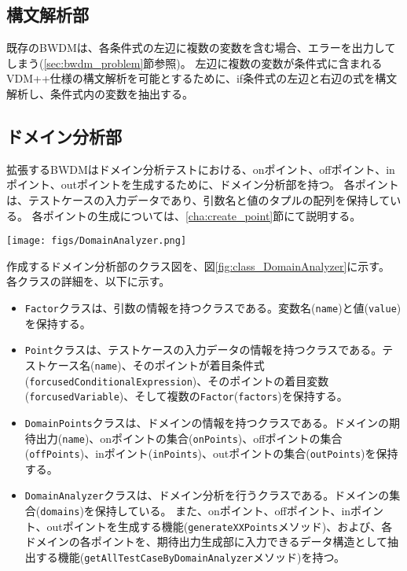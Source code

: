 \documentclass[uplatex, report, a4j, 10pt]{jsbook}
\newcommand\ttt[1]{\texttt{#1}}
\begin{document}
\subsection{構文解析部}
既存のBWDMは、各条件式の左辺に複数の変数を含む場合、エラーを出力してしまう(\ref{sec:bwdm_problem}節参照)。
左辺に複数の変数が条件式に含まれるVDM++仕様の構文解析を可能とするために、if条件式の左辺と右辺の式を構文解析し、条件式内の変数を抽出する。

\subsection{ドメイン分析部}\label{cha:DomainAnalyzer}
拡張するBWDMはドメイン分析テストにおける、onポイント、offポイント、inポイント、outポイントを生成するために、ドメイン分析部を持つ。
各ポイントは、テストケースの入力データであり、引数名と値のタプルの配列を保持している。
各ポイントの生成については、\ref{cha:create_point}節にて説明する。

\begin{figure*}[t]
  \begin{center}
    \texttt{[image: figs/DomainAnalyzer.png]}
    \caption{ドメイン分析部のクラス図}
    \label{fig:class_DomainAnalyzer}
  \end{center}
\end{figure*}

作成するドメイン分析部のクラス図を、図\ref{fig:class_DomainAnalyzer}に示す。
各クラスの詳細を、以下に示す。

\newcommand{\forcusedConditionalExpression}{\ttt{forcusedConditionalExpression}}

\begin{itemize}
  \item \ttt{Factor}クラスは、引数の情報を持つクラスである。変数名(\ttt{name})と値(\ttt{value})を保持する。
  \item \ttt{Point}クラスは、テストケースの入力データの情報を持つクラスである。テストケース名(\ttt{name})、そのポイントが着目条件式(\forcusedConditionalExpression{})、そのポイントの着目変数(\ttt{forcusedVariable})、そして複数の\ttt{Factor}(\ttt{factors})を保持する。
  \item \ttt{DomainPoints}クラスは、ドメインの情報を持つクラスである。ドメインの期待出力(\ttt{name})、onポイントの集合(\ttt{onPoints})、offポイントの集合(\ttt{offPoints})、inポイント(\ttt{inPoints})、outポイントの集合(\ttt{outPoints})を保持する。
  \item \ttt{DomainAnalyzer}クラスは、ドメイン分析を行うクラスである。ドメインの集合(\ttt{domains})を保持している。
        また、onポイント、offポイント、inポイント、outポイントを生成する機能(\ttt{generateXXPoints}メソッド)、および、各ドメインの各ポイントを、期待出力生成部に入力できるデータ構造として抽出する機能(\ttt{getAllTestCaseByDomainAnalyzer}メソッド)を持つ。

\end{itemize}
\end{document}
